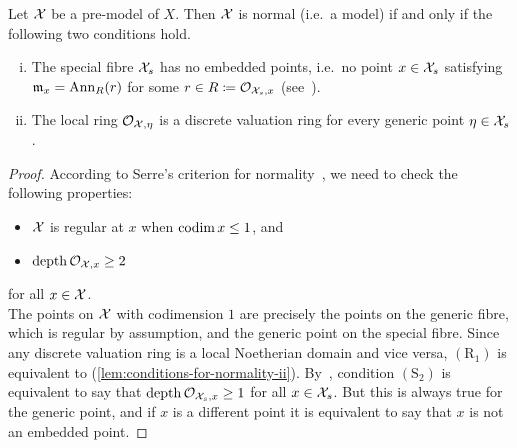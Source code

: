 \begin{lemma}\label{lem:conditions-for-normality}
    Let $\mathcal X$ be a pre-model of $X$.
    Then $\mathcal X$ is normal (i.e.\ a model) if and only if the following two conditions hold.
    \begin{enumerate}[(i)]
        \item The special fibre $\mathcal X_s$ has no embedded points, i.e.\ no point $x\in \mathcal X_s$ \label{lem:conditions-for-normality-i}
            satisfying $\mathfrak m_x = \mathrm{Ann}_{R}(r)$ for some $r\in R \coloneqq \mathcal{O}_{\mathcal X_s,x}$ (see~\cite[Definition 7.1.6]{Liu}).
        \item The local ring $\mathcal{O}_{\mathcal X,\eta}$ is a discrete valuation ring for every generic point $\eta \in \mathcal X_s$. \label{lem:conditions-for-normality-ii}
    \end{enumerate}
\end{lemma}

\begin{proof}
    According to Serre's criterion for normality~\cite[Theorem 8.2.23]{Liu},
    we need to check the following properties:
    \begin{itemize}
        \item[$(\mathrm{R}_1)$] $\mathcal X$ is regular at $x$ when $\operatorname{codim}{x} \leq 1$, and
        \item[$(\mathrm{S}_2)$] $\operatorname{depth}{\mathcal{O}_{\mathcal X,x}} \geq 2$
    \end{itemize}
    for all $x\in \mathcal X$. \\
    The points on $\mathcal X$ with codimension $1$ are precisely the points on the generic fibre, which is regular by assumption,
    and the generic point on the special fibre.
    Since any discrete valuation ring is a local Noetherian domain and vice versa, $(\mathrm{R}_1)$ is
    equivalent to (\ref{lem:conditions-for-normality-ii}).
    By~\cite[Proposition 8.2.11]{Liu}, condition $(\mathrm{S}_2)$ is equivalent to say
    that $\operatorname{depth}{\mathcal{O}_{\mathcal X_s, x}} \geq 1$ for all $x \in \mathcal X_s$.
    But this is always true for the generic point, and if $x$ is a different point it is equivalent to say that $x$ is not an embedded point.
\end{proof}

